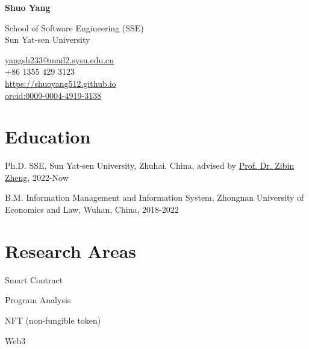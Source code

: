 \documentclass[12pt,letterpaper]{report}
\newcommand{\myname}{Shuo Yang}
\newcommand{\namefont}[1]{{\normalfont\bfseries\Huge{#1}}}
\newcommand{\listitemspace}{0.25em}
\renewenvironment{itemize}
{\begin{list}{}{\setlength{\leftmargin}{0em}
                \setlength{\parskip}{0em}
                \setlength{\itemsep}{\listitemspace}
                \setlength{\parsep}{\listitemspace}}}
{\end{list}}
\begin{document}
    \raggedright{}

    \namefont{\myname}

    \vspace{1em}
    \begin{minipage}[t]{0.700\textwidth}
        School of Software Engineering (SSE)\\
        Sun Yat-sen University
    \end{minipage}
    \begin{minipage}[t]{0.295\textwidth}
        \flushright{}
        \href{yangsh233@mail2.sysu.edu.cn}{yangsh233@mail2.sysu.edu.cn} \\
        +86 1355 429 3123 \\
        \href{https://shuoyang512.github.io}{https://shuoyang512.github.io}\\
        \href{https://orcid.org/0009-0004-4919-3138}{orcid:0009-0004-4919-3138}
    \end{minipage}

    \section*{Education}
    
    \begin{tablist}
      \item[Ph.D.] \tab{}SSE, Sun Yat-sen University, Zhuhai, China, advised by \href{http://www.zibinzheng.com/cv}{Prof. Dr. Zibin Zheng}, 2022-Now
      \item[B.M.] \tab{}Information Management and Information System, Zhongnan University of Economics and Law, Wuhan, China, 2018-2022
    \end{tablist}
    
    \section*{Research Areas}
    \begin{itemize}
      \item Smart Contract
      \item Program Analysis
      \item NFT (non-fungible token)
      \item Web3
    \end{itemize}
    
\end{document}
